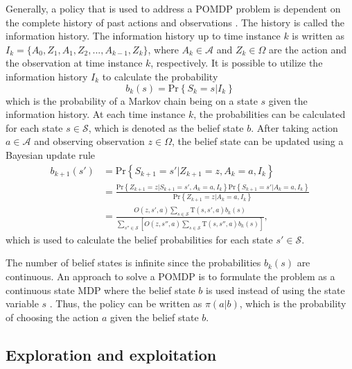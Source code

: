 \documentclass[english, 12pt, a4paper, elec, utf8, a-1b, online]{aaltothesis}
\numberwithin{equation}{section}
\newcommand{\Ss}{\mathcal{S}}
\newcommand{\As}{\mathcal{A}}
\newcommand{\Os}{\Omega}
\newcommand{\Op}{O}
\renewcommand{\Pr}[1]{\text{Pr}\left\{ #1 \right\}}
\begin{document}
Generally, a policy that is used to address a POMDP problem is dependent on the complete history of past actions and observations \cite{Krishnamurthy2016}. 
The history is called the information history.
The information history up to time instance $k$ is written as $I_k=\{A_0, Z_1, A_1, Z_2, ..., A_{k-1}, Z_{k}\}$, where $A_k \in \As$ and $Z_k \in \Os$ are the action and the observation at time instance $k$, respectively.
It is possible to utilize the information history $I_k$ to calculate the probability
\begin{equation}
    b_k(s) = \Pr{S_k=s|I_k}
\end{equation}
which is the probability of a Markov chain being on a state $s$ given the information history.
At each time instance $k$, the probabilities can be calculated for each state $s \in \Ss$, which is denoted as the belief state $b$.
After taking action $a \in \As$ and observing observation $z \in \Os$, the belief state can be updated using a Bayesian update rule \cite{Krishnamurthy2016}
\begin{align}
    b_{k+1}(s') 
    &= \Pr{S_{k+1}=s' | Z_{k+1}=z, A_k=a, I_k} \\
    &= \frac
        {\Pr{Z_{k+1}=z | S_{k+1}=s' , A_k=a, I_k} \Pr{S_{k+1}=s'| A_k=a, I_k}}
        {\Pr{Z_{k+1}=z | A_k=a, I_k}} \\
    &= \frac
        {\Op(z, s', a) \sum_{s \in \Ss} \mathrm{T}(s, s', a) b_k(s)}
        {\sum_{s''  \in \Ss} \left[ 
            \Op(z, s'', a) \sum_{s \in \Ss} \mathrm{T}(s, s'', a) b_k(s) \right]},  \label{eq:belief_state_update}
\end{align}
which is used to calculate the belief probabilities for each state $s' \in \Ss$.

The number of belief states is infinite since the probabilities $b_k(s)$ are continuous.
An approach to solve a POMDP is to formulate the problem as a continuous state MDP where the belief state $b$ is used instead of using the state variable $s$ \cite{Krishnamurthy2016}.
Thus, the policy can be written as $\pi(a | b)$, which is the probability of choosing the action $a$ given the belief state $b$.

\subsection{Exploration and exploitation}\label{sec:exp_exp}
\end{document}
